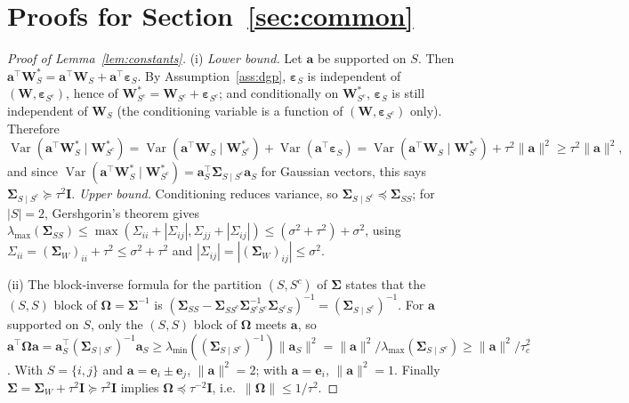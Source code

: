\documentclass[11pt]{article}
\theoremstyle{definition}
\newcommand{\bW}{\mathbf{W}}
\newcommand{\bI}{\mathbf{I}}
\newcommand{\beps}{\boldsymbol{\varepsilon}}
\newcommand{\bSig}{\boldsymbol{\Sigma}}
\newcommand{\bOm}{\boldsymbol{\Omega}}
\newcommand{\Var}{\operatorname{Var}}
\begin{document}
\section{Proofs for Section~\ref{sec:common}}\label{app:common}

\begin{proof}[Proof of Lemma~\ref{lem:constants}]
(i) \emph{Lower bound.} Let $\bm a$ be supported on $S$. Then $\bm a^\top\bW^\ast_S=\bm a^\top\bW_S+\bm a^\top\beps_S$. By Assumption~\ref{ass:dgp}, $\beps_S$ is independent of $(\bW,\beps_{S^c})$, hence of $\bW^\ast_{S^c}=\bW_{S^c}+\beps_{S^c}$; and conditionally on $\bW^\ast_{S^c}$, $\beps_S$ is still independent of $\bW_S$ (the conditioning variable is a function of $(\bW,\beps_{S^c})$ only). Therefore
\[
\Var(\bm a^\top\bW^\ast_S\mid\bW^\ast_{S^c})=\Var(\bm a^\top\bW_S\mid\bW^\ast_{S^c})+\Var(\bm a^\top\beps_S)=\Var(\bm a^\top\bW_S\mid\bW^\ast_{S^c})+\tau^2\|\bm a\|^2\ge\tau^2\|\bm a\|^2,
\]
and since $\Var(\bm a^\top\bW^\ast_S\mid\bW^\ast_{S^c})=\bm a_S^\top\bSig_{S\mid S^c}\bm a_S$ for Gaussian vectors, this says $\bSig_{S\mid S^c}\succeq\tau^2\bI$. \emph{Upper bound.} Conditioning reduces variance, so $\bSig_{S\mid S^c}\preceq\bSig_{SS}$; for $|S|=2$, Gershgorin's theorem gives $\lambda_{\max}(\bSig_{SS})\le\max(\Sigma_{ii}+|\Sigma_{ij}|,\Sigma_{jj}+|\Sigma_{ij}|)\le(\sigma^2+\tau^2)+\sigma^2$, using $\Sigma_{ii}=(\bSig_W)_{ii}+\tau^2\le\sigma^2+\tau^2$ and $|\Sigma_{ij}|=|(\bSig_W)_{ij}|\le\sigma^2$.

(ii) The block-inverse formula for the partition $(S,S^c)$ of $\bSig$ states that the $(S,S)$ block of $\bOm=\bSig^{-1}$ is $(\bSig_{SS}-\bSig_{SS^c}\bSig_{S^cS^c}^{-1}\bSig_{S^cS})^{-1}=(\bSig_{S\mid S^c})^{-1}$. For $\bm a$ supported on $S$, only the $(S,S)$ block of $\bOm$ meets $\bm a$, so $\bm a^\top\bOm\bm a=\bm a_S^\top(\bSig_{S\mid S^c})^{-1}\bm a_S\ge\lambda_{\min}((\bSig_{S\mid S^c})^{-1})\|\bm a_S\|^2=\|\bm a\|^2/\lambda_{\max}(\bSig_{S\mid S^c})\ge\|\bm a\|^2/\tau_c^2$. With $S=\{i,j\}$ and $\bm a=\bm e_i\pm\bm e_j$, $\|\bm a\|^2=2$; with $\bm a=\bm e_i$, $\|\bm a\|^2=1$. Finally $\bSig=\bSig_W+\tau^2\bI\succeq\tau^2\bI$ implies $\bOm\preceq\tau^{-2}\bI$, i.e.\ $\|\bOm\|\le1/\tau^2$.


\end{proof}
\end{document}
